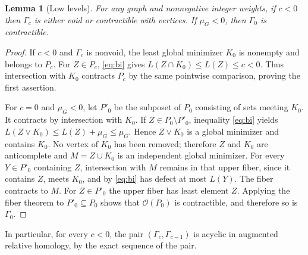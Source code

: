 \documentclass[11pt,a4paper]{article}
\newtheorem{lemma}[theorem]{Lemma}
\theoremstyle{definition}
\newcommand{\G}{\Gamma}
\begin{document}
\begin{lemma}[Low levels]\label{lem:negative}
For any graph and nonnegative integer weights, if $c<0$ then $\G_c$ is either void or contractible with vertices. If $\mu_G<0$, then $\G_0$ is contractible.
\end{lemma}
\begin{proof}
If $c<0$ and $\G_c$ is nonvoid, the least global minimizer $K_0$ is nonempty and belongs to $P_c$. For $Z\in P_c$, \eqref{eq:bi} gives $L(Z\cap K_0)\leq L(Z)\leq c<0$. Thus intersection with $K_0$ contracts $P_c$ by the same pointwise comparison, proving the first assertion.

For $c=0$ and $\mu_G<0$, let $P'_0$ be the subposet of $P_0$ consisting of sets meeting $K_0$. It contracts by intersection with $K_0$. If $Z\in P_0\setminus P'_0$, inequality \eqref{eq:bi} yields $L(Z\vee K_0)\leq L(Z)+\mu_G\leq\mu_G$. Hence $Z\vee K_0$ is a global minimizer and contains $K_0$. No vertex of $K_0$ has been removed; therefore $Z$ and $K_0$ are anticomplete and $M=Z\cup K_0$ is an independent global minimizer. For every $Y\in P'_0$ containing $Z$, intersection with $M$ remains in that upper fiber, since it contains $Z$, meets $K_0$, and by \eqref{eq:bi} has defect at most $L(Y)$. The fiber contracts to $M$. For $Z\in P'_0$ the upper fiber has least element $Z$. Applying the fiber theorem to $P'_0\subseteq P_0$ shows that $\mathcal O(P_0)$ is contractible, and therefore so is $\G_0$.
\end{proof}
In particular, for every $c<0$, the pair $(\G_c,\G_{c-1})$ is acyclic in augmented relative homology, by the exact sequence of the pair.
\end{document}
